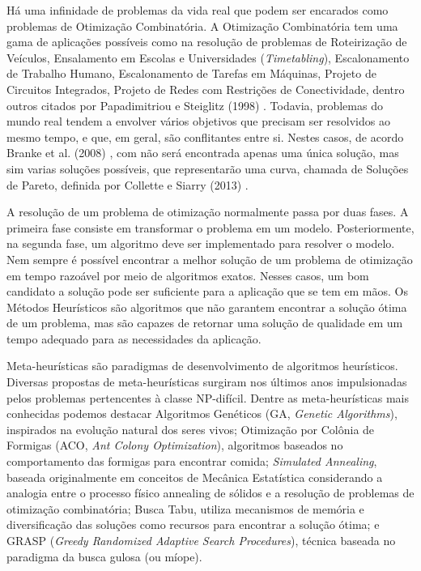 Há uma infinidade de problemas da vida real que podem ser encarados como problemas de Otimização Combinatória. A Otimização Combinatória tem uma gama de aplicações possíveis como na resolução de problemas de Roteirização de Veículos, Ensalamento em Escolas e Universidades (\textit{Timetabling}), Escalonamento de Trabalho Humano, Escalonamento de Tarefas em Máquinas, Projeto de Circuitos Integrados, Projeto de Redes com Restrições de Conectividade, dentro outros citados por Papadimitriou e Steiglitz (1998) \cite{papadimitriou1982combinatorial}. Todavia, problemas do mundo real tendem a envolver vários objetivos que precisam ser resolvidos ao mesmo tempo, e que, em geral, são conflitantes entre si. Nestes casos, de acordo Branke et al. (2008) \cite{branke2008multiobjective}, com não será encontrada apenas uma única solução, mas sim varias soluções possíveis, que representarão uma curva, chamada de Soluções de Pareto, definida por Collette e Siarry (2013) \cite{collette2013multiobjective}.

A resolução de um problema de otimização normalmente passa por duas fases. A primeira fase consiste em transformar o problema em um modelo. Posteriormente, na segunda fase, um algoritmo deve ser implementado para resolver o modelo. Nem sempre é possível encontrar a melhor solução de um problema de otimização em tempo razoável por meio de algoritmos exatos. Nesses casos, um bom candidato a solução pode ser suficiente para a aplicação que se tem em mãos. Os Métodos Heurísticos são algoritmos que não garantem encontrar a solução ótima de um problema, mas são capazes de retornar uma solução de qualidade em um tempo adequado para as necessidades da aplicação.

Meta-heurísticas são paradigmas de desenvolvimento de algoritmos heurísticos. Diversas propostas de meta-heurísticas surgiram nos últimos anos impulsionadas pelos problemas pertencentes à classe NP-difícil. Dentre as meta-heurísticas mais conhecidas podemos destacar Algoritmos Genéticos (GA, \textit{Genetic Algorithms}), inspirados na evolução natural dos seres vivos; Otimização por Colônia de Formigas (ACO, \textit{Ant Colony Optimization}), algoritmos baseados no comportamento das formigas para encontrar comida; \textit{Simulated Annealing}, baseada originalmente em conceitos de Mecânica Estatística considerando a analogia entre o processo físico annealing de sólidos e a resolução de problemas de otimização combinatória; Busca Tabu, utiliza mecanismos de memória e diversificação das soluções como recursos para encontrar a solução ótima; e GRASP (\textit{Greedy Randomized Adaptive Search Procedures}), técnica baseada no paradigma da busca gulosa (ou míope).

